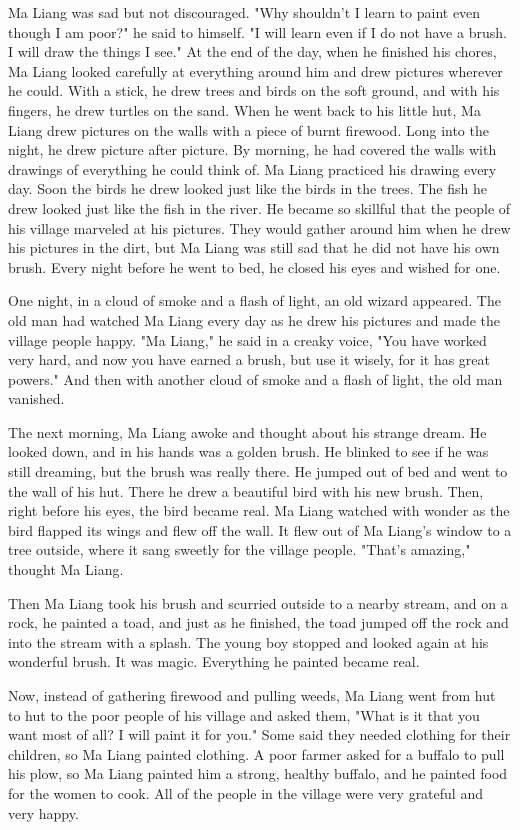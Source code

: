 Ma Liang was sad but not discouraged. "Why shouldn't I learn to paint even though I am poor?" he said to himself. "I will learn even if I do not have a brush. I will draw the things I see." At the end of the day, when he finished his chores, Ma Liang looked carefully at everything around him and drew pictures wherever he could. With a stick, he drew trees and birds on the soft ground, and with his fingers, he drew turtles on the sand. When he went back to his little hut, Ma Liang drew pictures on the walls with a piece of burnt firewood. Long into the night, he drew picture after picture. By morning, he had covered the walls with drawings of everything he could think of. Ma Liang practiced his drawing every day. Soon the birds he drew looked just like the birds in the trees. The fish he drew looked just like the fish in the river. He became so skillful that the people of his village marveled at his pictures. They would gather around him when he drew his pictures in the dirt, but Ma Liang was still sad that he did not have his own brush. Every night before he went to bed, he closed his eyes and wished for one.

One night, in a cloud of smoke and a flash of light, an old wizard appeared. The old man had watched Ma Liang every day as he drew his pictures and made the village people happy. "Ma Liang," he said in a creaky voice, "You have worked very hard, and now you have earned a brush, but use it wisely, for it has great powers." And then with another cloud of smoke and a flash of light, the old man vanished.

The next morning, Ma Liang awoke and thought about his strange dream. He looked down, and in his hands was a golden brush. He blinked to see if he was still dreaming, but the brush was really there. He jumped out of bed and went to the wall of his hut. There he drew a beautiful bird with his new brush. Then, right before his eyes, the bird became real. Ma Liang watched with wonder as the bird flapped its wings and flew off the wall. It flew out of Ma Liang's window to a tree outside, where it sang sweetly for the village people. "That's amazing," thought Ma Liang.

Then Ma Liang took his brush and scurried outside to a nearby stream, and on a rock, he painted a toad, and just as he finished, the toad jumped off the rock and into the stream with a splash. The young boy stopped and looked again at his wonderful brush. It was magic. Everything he painted became real.

Now, instead of gathering firewood and pulling weeds, Ma Liang went from hut to hut to the poor people of his village and asked them, "What is it that you want most of all? I will paint it for you." Some said they needed clothing for their children, so Ma Liang painted clothing. A poor farmer asked for a buffalo to pull his plow, so Ma Liang painted him a strong, healthy buffalo, and he painted food for the women to cook. All of the people in the village were very grateful and very happy.

